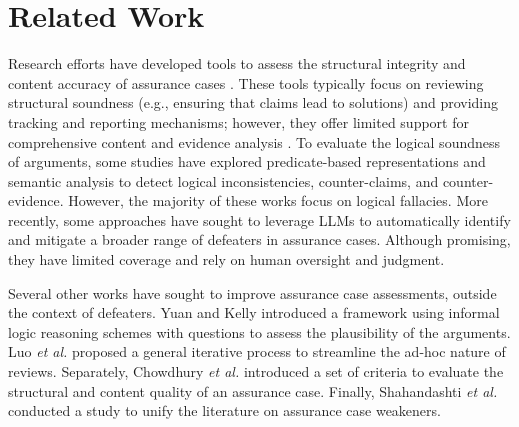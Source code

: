 \section{Related Work}
\label{sec:related}

Research efforts have developed tools to assess the structural integrity and content accuracy of assurance cases \cite{maksimov2019survey,10311213}. These tools typically focus on reviewing structural soundness (e.g., ensuring that claims lead to solutions) and providing tracking and reporting mechanisms; however, they offer limited support for comprehensive content and evidence analysis \cite{maksimov2019survey}. To evaluate the logical soundness of arguments, some studies \cite{murugesan2023semantic,muram2023attest, yuan2016automatically,rushby2015understanding} have explored predicate-based representations and semantic analysis to detect logical inconsistencies, counter-claims, and counter-evidence.
However, the majority of these works focus on logical fallacies.
More recently, some approaches \cite{gohar2024codefeater,AISupported} have sought to leverage LLMs to automatically identify and mitigate a broader range of defeaters in assurance cases. Although promising, they have limited coverage and rely on human oversight and judgment.

Several other works have sought to improve assurance case assessments, outside the context of defeaters. Yuan and Kelly \cite{yuan2012argument} introduced a framework using informal logic reasoning schemes with questions to assess the plausibility of the arguments. Luo \MakeLowercase{\textit{et al.}} \cite{luo2017systematic} proposed a general iterative process to streamline the ad-hoc nature of reviews. Separately, Chowdhury \MakeLowercase{\textit{et al.}} \cite{chowdhury2020systematic} introduced a set of criteria to evaluate the structural and content quality of an assurance case. Finally, Shahandashti \MakeLowercase{\textit{et al.}} \cite{shahandashti2024prisma} conducted a study to unify the literature on assurance case weakeners. 
